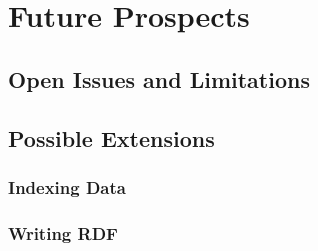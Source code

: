 \documentclass[12pt,a4paper]{article}
\begin{document}


\section{Future Prospects}

\subsection{Open Issues and Limitations}

\subsection{Possible Extensions}
\subsubsection{Indexing Data}
\subsubsection{Writing RDF}
\end{document}

